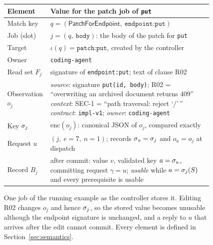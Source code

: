 \begin{figure}[!t]
\centering\footnotesize
\renewcommand{\arraystretch}{1.15}
\begin{tabular}{@{}>{\raggedright\arraybackslash}p{}>{\raggedright\arraybackslash}p{}@{}}
\toprule
Element & Value for the patch job of \texttt{put}\\\midrule
Match key & $q=(\textsf{PatchForEndpoint},\ \texttt{endpoint:put})$\\
Job (slot) & $j=(q,\ \texttt{body})$: the body of the patch for \texttt{put}\\
Target & $\iota(q)=\texttt{patch:put}$, created by the controller\\
Owner & \texttt{coding-agent}\\
Read set $F_j$ & signature of \texttt{endpoint:put}; text of clause R02\\
Observation $o_j$ & \textit{source}: signature \texttt{put(id, body)}; R02 = ``overwriting an archived document returns 409''\newline
\textit{context}: SEC-1 = ``path traversal: reject `/'\,''\newline
\textit{contract}: \texttt{impl-v1}; \textit{owner}: \texttt{coding-agent}\\
Key $\sigma_j$ & $\mathrm{enc}(o_j)$: canonical JSON of $o_j$, compared exactly\\
Request $u$ & $(j,\ e{=}7,\ n{=}1)$; records $\sigma_u=\sigma_j$ and $o_u=o_j$ at dispatch\\
Record $B_j$ & after commit: value $v$, validated key $a=\sigma_u$, committing request $\gamma=u$; \emph{usable} while $a=\sigma_j(S)$ and every prerequisite is usable\\
\bottomrule
\end{tabular}
\caption{One job of the running example as the controller stores it. Editing R02 changes $o_j$ and hence $\sigma_j$, so the stored value becomes unusable although the endpoint signature is unchanged, and a reply to $u$ that arrives after the edit cannot commit. Every element is defined in Section~\ref{sec:semantics}.}\label{lst:job}
\end{figure}

